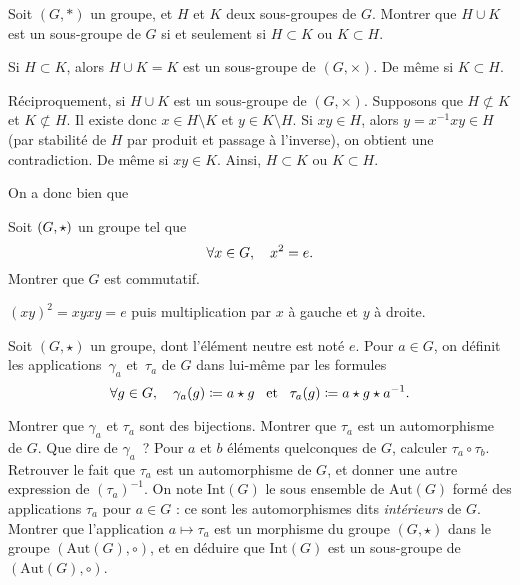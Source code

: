 \documentclass{magnolia}
\begin{document}
Soit $(G,*)$ un groupe, et $H$ et $K$ deux sous-groupes de $G$. Montrer que
$H\cup K$ est un sous-groupe de $G$ si et seulement si  $H\subset K$ ou
$K\subset  H$.

\begin{sol}
Si $H\subset K$, alors $H\cup K = K$ est un sous-groupe de  $(G,\times)$. De même si $K\subset H$.
    
        Réciproquement, si $H\cup K$ est un sous-groupe de  $(G,\times)$. Supposons que $H\not\subset K$ et $K\not\subset H$. 
        Il existe donc $x \in H\setminus K$ et $y \in K\setminus H$. 
        Si $xy \in H$, alors $y = x^{-1}xy \in H$ (par stabilité de $H$ par produit et passage à l'inverse), on obtient une contradiction. De même si $xy \in K$.
        Ainsi, $H\subset K$ ou $K\subset H$.
        
        On a donc bien que 
        \begin{center}
        \end{center}
\end{sol}

Soit $\left(G,\star\right)$ un groupe tel que
\[\forall x\in G ,\quad x^2=e.\]
Montrer que $G$ est commutatif.

\begin{sol}
$(xy)^2=xyxy=e$ puis multiplication par $x$ à gauche et $y$ à droite.
\end{sol}

Soit $(G,\star)$ un groupe, dont l'élément neutre est noté $e$. Pour $a\in G$,
on définit les  applications~$\gamma_a$ et~$\tau_a$ de $G$ dans lui-même par les
formules
\[\forall g\in G ,\quad \gamma_a(g)\coloneqq a\star g \quad\!\text{et}\quad\! \tau_a(g)\coloneqq a\star g\star a^{-1}.\]
\begin{questions}
\question Montrer que $\gamma_a$ et $\tau_a$ sont des bijections. Montrer que
  $\tau_a$ est un automorphisme de $G$. Que dire de $\gamma_a$~?
\question Pour $a$ et $b$ éléments quelconques de $G$, calculer
  $\tau_a\circ \tau_b$. Retrouver le fait que $\tau_a$ est un automorphisme de $G$,
  et donner une autre expression de $(\tau_a)^{-1}$.
\question On note $\text{Int}(G)$ le sous ensemble de $\text{Aut}(G)$ formé
  des applications $\tau_a$ pour $a\in G$ : ce sont les automorphismes dits
  {\em intérieurs}\/ de $G$. Montrer  que l'application $a\mapsto \tau_a$ est
  un morphisme  du groupe $(G,\star )$ dans  le groupe $(\text{Aut}(G),\circ)$, et en
  déduire que $\text{Int}(G)$ est un sous-groupe de $(\text{Aut}(G),\circ)$.
\end{questions}
\end{document}
